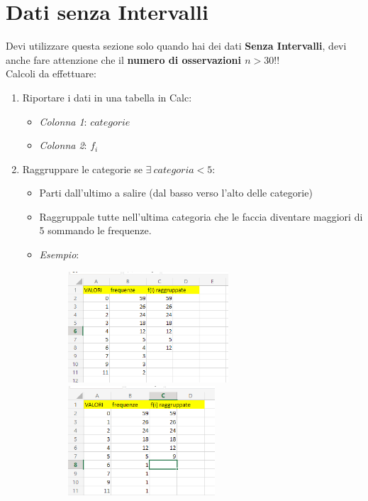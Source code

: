 \section{Dati senza Intervalli}

Devi utilizzare questa sezione solo quando hai dei dati \textbf{Senza
    Intervalli}, devi anche fare attenzione che il \textbf{numero di osservazioni $n
        > 30$}!!\\

Calcoli da effettuare:

\begin{enumerate}
    \item Riportare i dati in una tabella in Calc:
          \begin{itemize}
              \item \textit{Colonna 1}: $categorie$
              \item \textit{Colonna 2}: $f_i$
          \end{itemize}
    \item Raggruppare le categorie se $\exists \ categoria < 5$:
          \begin{itemize}
              \item Parti dall'ultimo a salire (dal basso verso l'alto delle
                    categorie)
              \item Raggruppale tutte nell'ultima categoria che le faccia
                    diventare maggiori di 5 sommando le frequenze.
              \item \textit{Esempio}:
                    \begin{figure}[H]
                        \centering
                        \includegraphics[width=6cm, keepaspectratio]{capitoli/goodnes_of_fit/imgs/vesceragay.png}
                        \includegraphics[width=5.5cm, keepaspectratio]{capitoli/goodnes_of_fit/imgs/POSTAMOLTOGAY.png}

\end{figure}
\end{itemize}
\end{enumerate}
